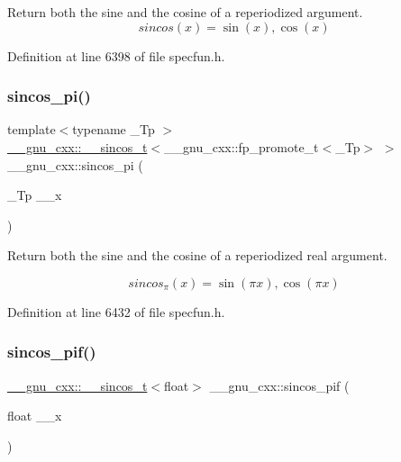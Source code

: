 Return both the sine and the cosine of a reperiodized argument. \[ sincos(x) = {\sin(x), \cos(x)} \] 

Definition at line 6398 of file specfun.\+h.

\mbox{\label{group__gnu__math__spec__func_ga6553883f127ea0de67041c3128e03813}} 
\subsubsection{\texorpdfstring{sincos\+\_\+pi()}{sincos\_pi()}}
{\footnotesize\ttfamily template$<$typename \+\_\+\+Tp $>$ \\
\hyperlink{struct____gnu__cxx_1_1____sincos__t}{\+\_\+\+\_\+gnu\+\_\+cxx\+::\+\_\+\+\_\+sincos\+\_\+t}$<$\+\_\+\+\_\+gnu\+\_\+cxx\+::fp\+\_\+promote\+\_\+t$<$\+\_\+\+Tp$>$ $>$ \+\_\+\+\_\+gnu\+\_\+cxx\+::sincos\+\_\+pi (\begin{DoxyParamCaption}\item[{\+\_\+\+Tp}]{\+\_\+\+\_\+x }\end{DoxyParamCaption})\hspace{0.3cm}{\ttfamily [inline]}}

Return both the sine and the cosine of a reperiodized real argument.

\[ sincos_\pi(x) = {\sin(\pi x), \cos(\pi x)} \] 

Definition at line 6432 of file specfun.\+h.

\mbox{\label{group__gnu__math__spec__func_gacf416c867a8a456f8f0e3d8b45ca8bd5}} 
\subsubsection{\texorpdfstring{sincos\+\_\+pif()}{sincos\_pif()}}
{\footnotesize\ttfamily \hyperlink{struct____gnu__cxx_1_1____sincos__t}{\+\_\+\+\_\+gnu\+\_\+cxx\+::\+\_\+\+\_\+sincos\+\_\+t}$<$float$>$ \+\_\+\+\_\+gnu\+\_\+cxx\+::sincos\+\_\+pif (\begin{DoxyParamCaption}\item[{float}]{\+\_\+\+\_\+x }\end{DoxyParamCaption})\hspace{0.3cm}{\ttfamily [inline]}}

